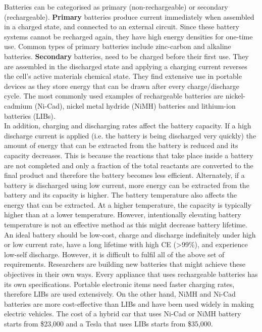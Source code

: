 Batteries can be categorised as primary (non-rechargeable) or secondary (rechargeable). \textbf{Primary} batteries produce current immediately when assembled in a charged state, and connected to an external circuit. Since these battery systems cannot be recharged again, they have high energy densities for one-time use. Common types of primary batteries include zinc-carbon and alkaline batteries. 
\textbf{Secondary} batteries, need to be charged before their first use. They are assembled in the discharged state and applying a charging current reverses the cell's active materials chemical state. They find extensive use in portable devices as they store energy that can be drawn after every charge/discharge cycle. The most commonly used examples of rechargeable batteries are nickel-cadmium (Ni-Cad), nickel metal hydride (NiMH) batteries and lithium-ion batteries (LIBs). \\  
In addition, charging and discharging rates affect the battery capacity. If a high discharge current is applied (i.e. the battery is being discharged very quickly) the amount of energy that can be extracted from the battery is reduced and its capacity decreases. This is because the reactions that take place inside a battery are not completed and only a fraction of the total reactants are converted to the final product and therefore the battery becomes less efficient. Alternately, if a battery is discharged using low current, more energy can be extracted from the battery and its capacity is higher. The battery temperature also affects the energy that can be extracted. At a higher temperature, the capacity is typically higher than at a lower temperature. However, intentionally elevating battery temperature is not an effective method as this might decrease battery lifetime\cite{leng_effect_2015, ma_temperature_2018}. 
An ideal battery should be low-cost, charge and discharge indefinitely under high or low current rate, have a long lifetime with high CE (>99\%), and experience low-self discharge. However, it is difficult to fulfil all of the above set of requirements. Researchers are building new batteries that might achieve these objectives in their own ways\cite{slater_sodium-ion_2013,jian_carbon_2015,aurbach_prototype_2000,lin_ultrafast_2015}. Every appliance that uses rechargeable batteries has its own specifications. Portable electronic items need faster charging rates, therefore LIBs are used extensively. On the other hand, NiMH and Ni-Cad batteries are more cost-effective than LIBs and have been used widely in making electric vehicles. The cost of a hybrid car that uses Ni-Cad or NiMH battery starts from \$23,000 and a Tesla that uses LIBs starts from \$35,000. \\

